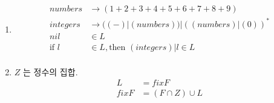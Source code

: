 \documentclass {article}
\begin{document}
\begin{enumerate}
\item
  \begin{align*}
    numbers &\rightarrow (1 + 2 + 3 + 4 + 5 + 6 + 7 + 8 + 9) \\
    integers &\rightarrow ((-) | (numbers)) | ((numbers) | (0))^* \\
    nil &\in L \\
    \text{if } l &\in L, \text{then } (integers) | l \in L \\
  \end{align*}
\item
  $Z$ 는 정수의 집합.
  \begin{align*}
    L &= fixF \\
    fixF &= ( F \cap Z ) \cup L \\
  \end{align*}
\end{enumerate}
\end{document}
